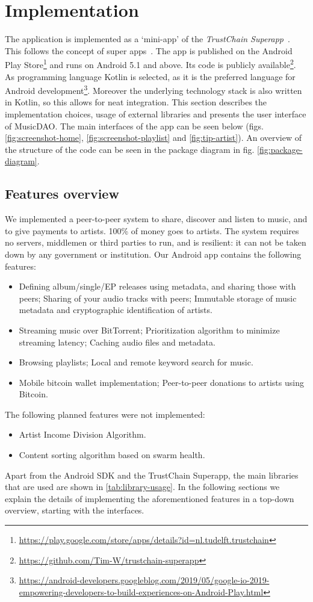 \chapter{Implementation}
The application is implemented as a `mini-app' of the \textit{TrustChain Superapp}~\citep{mattskala2020}. This follows the concept of super apps~\citep{kpmg2019superapps}. The app is published on the Android Play Store\footnote{\url{https://play.google.com/store/apps/details?id=nl.tudelft.trustchain}} and runs on Android 5.1 and above. Its code is publicly available\footnote{\url{https://github.com/Tim-W/trustchain-superapp}}. As programming language Kotlin is selected, as it is the preferred language for Android development\footnote{\url{https://android-developers.googleblog.com/2019/05/google-io-2019-empowering-developers-to-build-experiences-on-Android-Play.html}}. Moreover the underlying technology stack is also written in Kotlin, so this allows for neat integration. This section describes the implementation choices, usage of external libraries and presents the user interface of MusicDAO. The main interfaces of the app can be seen below (figs. \ref{fig:screenshot-home}, \ref{fig:screenshot-playlist} and \ref{fig:tip-artist}). An overview of the structure of the code can be seen in the package diagram in fig. \ref{fig:package-diagram}.

\section{Features overview}
We implemented a peer-to-peer system to share, discover and listen to music, and to give payments to artists. 100\% of money goes to artists. The system requires no servers, middlemen or third parties to run, and is resilient: it can not be taken down by any government or institution. Our Android app contains the following features:
\begin{itemize}
    \item Defining album/single/EP releases using metadata, and sharing those with peers; Sharing of your audio tracks with peers; Immutable storage of music metadata and cryptographic identification of artists.
    \item Streaming music over BitTorrent; Prioritization algorithm to minimize streaming latency; Caching audio files and metadata.
    \item Browsing playlists; Local and remote keyword search for music.
    \item Mobile bitcoin wallet implementation; Peer-to-peer donations to artists using Bitcoin.
\end{itemize}
The following planned features were not implemented:
\begin{itemize}
    \item Artist Income Division Algorithm.
    \item Content sorting algorithm based on swarm health.
\end{itemize}
Apart from the Android SDK and the TrustChain Superapp, the main libraries that are used are shown in \ref{tab:library-usage}. In the following sections we explain the details of implementing the aforementioned features in a top-down overview, starting with the interfaces.

